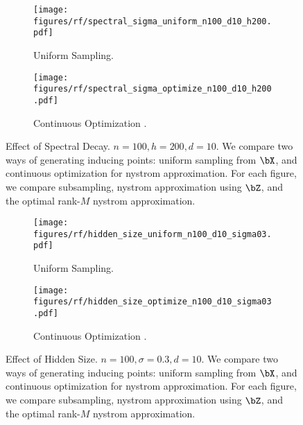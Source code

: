 \begin{figure}[h]
\centering
\begin{subfigure}[b]{\textwidth}
       \texttt{[image: figures/rf/spectral\_sigma\_uniform\_n100\_d10\_h200.pdf]}
       \caption{Uniform Sampling.}
      \end{subfigure}
      \hspace{2em}
\begin{subfigure}[b]{\textwidth}
       \texttt{[image: figures/rf/spectral\_sigma\_optimize\_n100\_d10\_h200.pdf]}
       \caption{Continuous Optimization .}
      \end{subfigure}
      \hspace{2em}
\caption{Effect of Spectral Decay. $n=100, h=200, d=10$. We compare two ways of generating inducing points: uniform sampling from $\bX$, and continuous optimization for nystrom approximation. For each figure, we compare subsampling, nystrom approximation using $\bZ$, and the optimal rank-$M$ nystrom approximation. }
\end{figure}

\begin{figure}[h]
\centering
\begin{subfigure}[b]{\textwidth}
       \texttt{[image: figures/rf/hidden\_size\_uniform\_n100\_d10\_sigma03.pdf]}
       \caption{Uniform Sampling.}
      \end{subfigure}
      \hspace{2em}
\begin{subfigure}[b]{\textwidth}
       \texttt{[image: figures/rf/hidden\_size\_optimize\_n100\_d10\_sigma03.pdf]}
       \caption{Continuous Optimization .}
      \end{subfigure}
      \hspace{2em}
\caption{Effect of Hidden Size. $n=100, \sigma=0.3, d=10$. We compare two ways of generating inducing points: uniform sampling from $\bX$, and continuous optimization for nystrom approximation. For each figure, we compare subsampling, nystrom approximation using $\bZ$, and the optimal rank-$M$ nystrom approximation.}
\end{figure}


